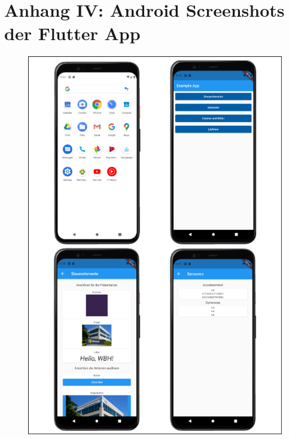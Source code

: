 \chapter{Anhang IV: Android Screenshots der Flutter App}
\label{chap:AnhangAndroidScreenshotsFlutter}


\begin{figure}[ht!]
 \includegraphics[width=\textwidth,keepaspectratio]{Images/Screenshot/AndroidScrenshotIflutter.png}
\end{figure}

